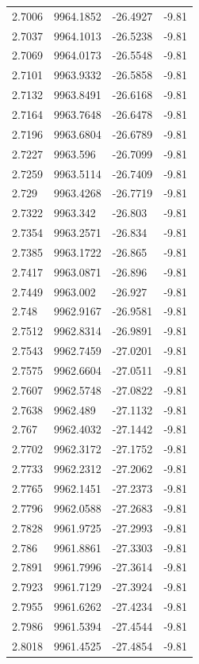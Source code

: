 \begin{table}[H]
\begin{tabular}{llll}
2.7006 & 9964.1852 & -26.4927 & -9.81 \\
2.7037 & 9964.1013 & -26.5238 & -9.81 \\
2.7069 & 9964.0173 & -26.5548 & -9.81 \\
2.7101 & 9963.9332 & -26.5858 & -9.81 \\
2.7132 & 9963.8491 & -26.6168 & -9.81 \\
2.7164 & 9963.7648 & -26.6478 & -9.81 \\
2.7196 & 9963.6804 & -26.6789 & -9.81 \\
2.7227 & 9963.596 & -26.7099 & -9.81 \\
2.7259 & 9963.5114 & -26.7409 & -9.81 \\
2.729 & 9963.4268 & -26.7719 & -9.81 \\
2.7322 & 9963.342 & -26.803 & -9.81 \\
2.7354 & 9963.2571 & -26.834 & -9.81 \\
2.7385 & 9963.1722 & -26.865 & -9.81 \\
2.7417 & 9963.0871 & -26.896 & -9.81 \\
2.7449 & 9963.002 & -26.927 & -9.81 \\
2.748 & 9962.9167 & -26.9581 & -9.81 \\
2.7512 & 9962.8314 & -26.9891 & -9.81 \\
2.7543 & 9962.7459 & -27.0201 & -9.81 \\
2.7575 & 9962.6604 & -27.0511 & -9.81 \\
2.7607 & 9962.5748 & -27.0822 & -9.81 \\
2.7638 & 9962.489 & -27.1132 & -9.81 \\
2.767 & 9962.4032 & -27.1442 & -9.81 \\
2.7702 & 9962.3172 & -27.1752 & -9.81 \\
2.7733 & 9962.2312 & -27.2062 & -9.81 \\
2.7765 & 9962.1451 & -27.2373 & -9.81 \\
2.7796 & 9962.0588 & -27.2683 & -9.81 \\
2.7828 & 9961.9725 & -27.2993 & -9.81 \\
2.786 & 9961.8861 & -27.3303 & -9.81 \\
2.7891 & 9961.7996 & -27.3614 & -9.81 \\
2.7923 & 9961.7129 & -27.3924 & -9.81 \\
2.7955 & 9961.6262 & -27.4234 & -9.81 \\
2.7986 & 9961.5394 & -27.4544 & -9.81 \\
2.8018 & 9961.4525 & -27.4854 & -9.81 \\

\end{tabular}
\end{table}
